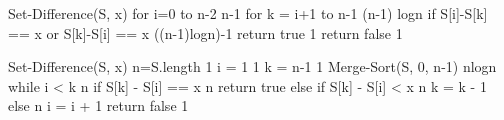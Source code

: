 Set-Difference(S, x)
	for i=0 to n-2							n-1
		for k = i+1 to n-1					(n-1) logn
			if S[i]-S[k] == x or S[k]-S[i] == x 	((n-1)logn)-1
				return true					1
	return false								1

Set-Difference(S, x)
	n=S.length				1
	i =  1					1
	k = n-1 				1
	Merge-Sort(S, 0, n-1)		nlogn
	while i < k				n
		if S[k] - S[i] == x 		n
			return true
		else if S[k] - S[i] < x 	n
			k = k - 1
		else				n
			i = i + 1
	return false				1
			
		